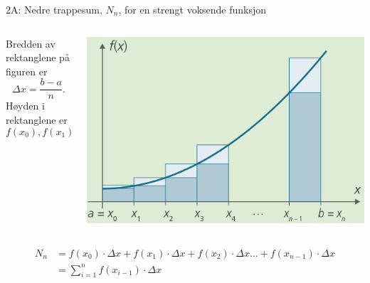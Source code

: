 \greenheader
\begin{frame}{2A: Nedre trappesum, $N_n$,  for en strengt voksende funksjon}
    \begin{columns} 
        \begin{column}{0.40\textwidth}
            Bredden av rektanglene på figuren er 
            \[
                \Delta x = \frac{b-a}{n}.
            \]
            Høyden i rektanglene er 
            \[
                f(x_0), f(x_1), f(x_2), \dots, f(x_{n-1}).
            \]
           
            
        \end{column}
        \begin{column}{0.60\textwidth}
            \centering
            \includegraphics[width=1\linewidth]{R2-K2A-15.png}
        \end{column}
    \end{columns}
    \begin{align*}
                 N_n &=  
                 f(x_0)\cdot \Delta x + f(x_1)\cdot \Delta x + f(x_2)\cdot \Delta x \dots + f(x_{n-1})\cdot \Delta x\\
                &=  \sum_{i=1}^{n} f(x_{i-1})\cdot \Delta x
            \end{align*}
\end{frame}


